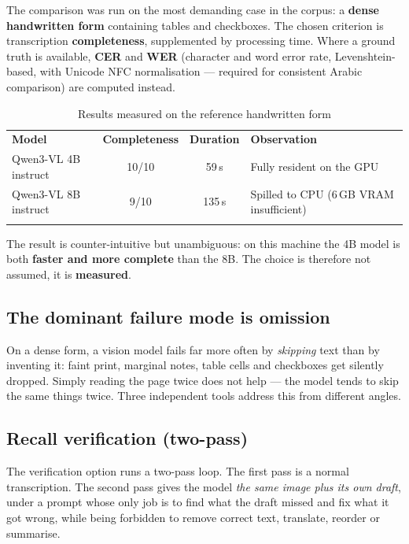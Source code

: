 \documentclass[11pt,a4paper]{article}
\newcommand{\toprule}{\noalign{\hrule height 0.9pt}\noalign{\vskip 3pt}}
\newcommand{\midrule}{\noalign{\vskip 3pt}\noalign{\hrule height 0.4pt}\noalign{\vskip 3pt}}
\newcommand{\bottomrule}{\noalign{\vskip 3pt}\noalign{\hrule height 0.9pt}}
\begin{document}
The comparison was run on the most demanding case in the corpus: a
\textbf{dense handwritten form} containing tables and checkboxes. The chosen
criterion is transcription \textbf{completeness}, supplemented by processing
time. Where a ground truth is available, \textbf{CER} and \textbf{WER}
(character and word error rate, Levenshtein-based, with Unicode NFC
normalisation --- required for consistent Arabic comparison) are computed
instead.

\begin{table}[H]
\centering
\begin{tabular}{@{}L{4.2cm}ccL{5.4cm}@{}}
\toprule
\textbf{Model} & \textbf{Completeness} & \textbf{Duration} & \textbf{Observation} \\
\midrule
Qwen3-VL 4B instruct & 10/10 & 59\,s & Fully resident on the GPU \\
Qwen3-VL 8B instruct & 9/10 & 135\,s & Spilled to CPU (6\,GB VRAM insufficient) \\
\bottomrule
\end{tabular}
\caption{Results measured on the reference handwritten form}
\end{table}

The result is counter-intuitive but unambiguous: on this machine the 4B model
is both \textbf{faster and more complete} than the 8B. The choice is therefore
not assumed, it is \textbf{measured}.

\subsection{The dominant failure mode is omission}

On a dense form, a vision model fails far more often by \emph{skipping} text
than by inventing it: faint print, marginal notes, table cells and checkboxes
get silently dropped. Simply reading the page twice does not help --- the model
tends to skip the same things twice. Three independent tools address this from
different angles.

\subsection{Recall verification (two-pass)}

The verification option runs a two-pass loop. The first pass is a normal
transcription. The second pass gives the model \emph{the same image plus its own
draft}, under a prompt whose only job is to find what the draft missed and fix
what it got wrong, while being forbidden to remove correct text, translate,
reorder or summarise.
\end{document}
